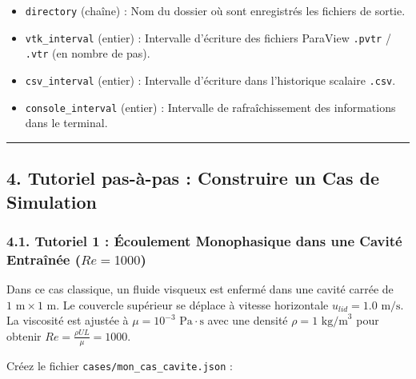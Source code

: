 \documentclass[
  french,
]{article}
\providecommand{\tightlist}{%
  \setlength{\itemsep}{0pt}\setlength{\parskip}{0pt}}
\begin{document}
\begin{itemize}
\tightlist
\item
  \texttt{directory} (chaîne) : Nom du dossier où sont enregistrés les
  fichiers de sortie.
\item
  \texttt{vtk\_interval} (entier) : Intervalle d'écriture des fichiers
  ParaView \texttt{.pvtr} / \texttt{.vtr} (en nombre de pas).
\item
  \texttt{csv\_interval} (entier) : Intervalle d'écriture dans
  l'historique scalaire \texttt{.csv}.
\item
  \texttt{console\_interval} (entier) : Intervalle de rafraîchissement
  des informations dans le terminal.
\end{itemize}

\begin{center}\rule{0.5\linewidth}{0.5pt}\end{center}

\subsection{4. Tutoriel pas-à-pas : Construire un Cas de
Simulation}\label{tutoriel-pas-uxe0-pas-construire-un-cas-de-simulation}

\subsubsection{\texorpdfstring{4.1. Tutoriel 1 : Écoulement Monophasique
dans une Cavité Entraînée
(\(Re=1000\))}{4.1. Tutoriel 1 : Écoulement Monophasique dans une Cavité Entraînée (Re=1000)}}\label{tutoriel-1-uxe9coulement-monophasique-dans-une-cavituxe9-entrauxeenuxe9e-re1000}

Dans ce cas classique, un fluide visqueux est enfermé dans une cavité
carrée de \(1\text{ m} \times 1\text{ m}\). Le couvercle supérieur se
déplace à vitesse horizontale \(u_{lid} = 1.0\text{ m/s}\). La viscosité
est ajustée à \(\mu = 10^{-3}\text{ Pa}\cdot\text{s}\) avec une densité
\(\rho = 1\text{ kg/m}^3\) pour obtenir
\(Re = \frac{\rho U L}{\mu} = 1000\).

Créez le fichier \texttt{cases/mon\_cas\_cavite.json} :
\end{document}
